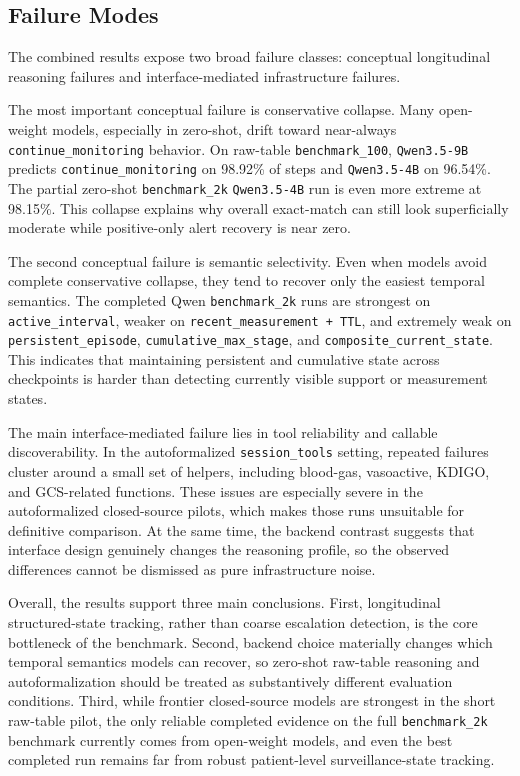 \subsection{Failure Modes}

The combined results expose two broad failure classes: conceptual longitudinal reasoning failures and interface-mediated infrastructure failures.

The most important conceptual failure is conservative collapse. Many open-weight models, especially in zero-shot, drift toward near-always \texttt{continue\_monitoring} behavior. On raw-table \texttt{benchmark\_100}, \texttt{Qwen3.5-9B} predicts \texttt{continue\_monitoring} on 98.92\% of steps and \texttt{Qwen3.5-4B} on 96.54\%. The partial zero-shot \texttt{benchmark\_2k} \texttt{Qwen3.5-4B} run is even more extreme at 98.15\%. This collapse explains why overall exact-match can still look superficially moderate while positive-only alert recovery is near zero.

The second conceptual failure is semantic selectivity. Even when models avoid complete conservative collapse, they tend to recover only the easiest temporal semantics. The completed Qwen \texttt{benchmark\_2k} runs are strongest on \texttt{active\_interval}, weaker on \texttt{recent\_measurement + TTL}, and extremely weak on \texttt{persistent\_episode}, \texttt{cumulative\_max\_stage}, and \texttt{composite\_current\_state}. This indicates that maintaining persistent and cumulative state across checkpoints is harder than detecting currently visible support or measurement states.

The main interface-mediated failure lies in tool reliability and callable discoverability. In the autoformalized \texttt{session\_tools} setting, repeated failures cluster around a small set of helpers, including blood-gas, vasoactive, KDIGO, and GCS-related functions. These issues are especially severe in the autoformalized closed-source pilots, which makes those runs unsuitable for definitive comparison. At the same time, the backend contrast suggests that interface design genuinely changes the reasoning profile, so the observed differences cannot be dismissed as pure infrastructure noise.

Overall, the results support three main conclusions. First, longitudinal structured-state tracking, rather than coarse escalation detection, is the core bottleneck of the benchmark. Second, backend choice materially changes which temporal semantics models can recover, so zero-shot raw-table reasoning and autoformalization should be treated as substantively different evaluation conditions. Third, while frontier closed-source models are strongest in the short raw-table pilot, the only reliable completed evidence on the full \texttt{benchmark\_2k} benchmark currently comes from open-weight models, and even the best completed run remains far from robust patient-level surveillance-state tracking.
